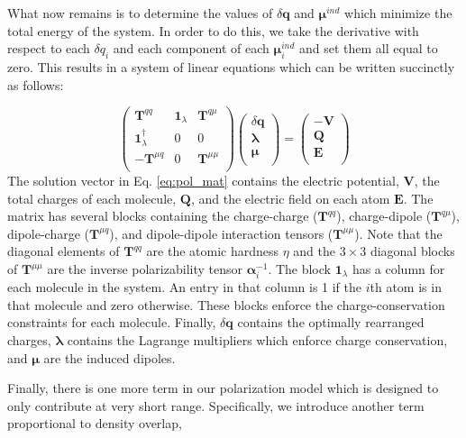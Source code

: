 \documentclass[journal=jctcce,manuscript=article]{achemso}
\begin{document}
What now remains is to determine the values of $\delta \bm{q}$ and $\bm{\mu}^{ind}$
which minimize the total energy of the system. In order to do this, we take
the derivative with respect to each $\delta q_i$ and each component of each
$\bm{\mu}_i^{ind}$ and set them all equal to zero. This results in a system of linear
equations which can be written succinctly as follows:

\begin{equation}
  \begin{pmatrix}
    \bm{T}^{qq} & \bm{1}_\lambda & \bm{T}^{q\mu} \\
    \bm{1}_\lambda^\dagger & 0 & 0 \\
    -\bm{T}^{\mu q} & 0 & \bm{T}^{\mu\mu} \\
  \end{pmatrix}
  \begin{pmatrix}
    \delta \bm{q} \\
    \bm{\lambda} \\
    \bm{\mu} \\
  \end{pmatrix}
  =
  \begin{pmatrix}
    -\bm{V} \\
    \bm{Q} \\
    \bm{E} \\
  \end{pmatrix}
  \label{eq:pol_mat}
\end{equation}
The solution vector in Eq. \ref{eq:pol_mat} contains the electric potential,
$\bm{V}$, the total charges of each molecule, $\bm{Q}$, and the electric
field on each atom $\bm{E}$. The matrix has several blocks containing the
charge-charge ($\bm{T}^{qq}$), charge-dipole ($\bm{T}^{q\mu}$),
dipole-charge ($\bm{T}^{\mu q}$), and dipole-dipole interaction tensors ($\bm{T}^{\mu\mu}$).
Note that the diagonal elements of $\bm{T}^{qq}$ are the atomic hardness $\eta$ and
the $3\times 3$ diagonal blocks of $\bm{T}^{\mu\mu}$ are the inverse polarizability tensor
$\bm{\alpha}_i^{-1}$. The block $\bm{1}_\lambda$ has a column for each molecule in the system.
An entry in that column is 1 if the $i$th atom is in that molecule and zero otherwise.
These blocks enforce the charge-conservation constraints for each molecule.
Finally, $\delta\bm{q}$ contains the optimally rearranged charges, $\bm{\lambda}$ contains
the Lagrange multipliers which enforce charge conservation, and $\bm{\mu}$ are the induced dipoles.

Finally, there is one more term in our polarization model which is designed to only contribute at very
short range. Specifically, we introduce another term proportional to density overlap,
\end{document}
